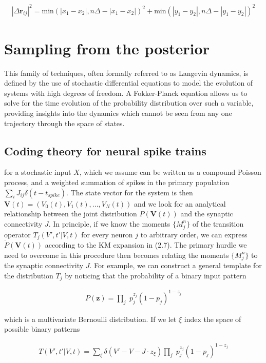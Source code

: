 \documentclass{ucetd}
\begin{document}
\begin{align*}
|\Delta\mathbf{r}_{ij}|^{2} = \mathrm{min}(|x_1 - x_2|, n\Delta - |x_1 - x_2|)^2 + \mathrm{min}(|y_1 - y_2|, n\Delta - |y_1 - y_2|)^2
\end{align*}


\chapter{Sampling from the posterior}

This family of techniques, often formally referred to as Langevin dynamics, is defined by the use of stochastic differential equations to model the evolution of systems with high degrees of freedom. A Fokker-Planck equation allows us to solve for the time evolution of the probability distribution over such a variable, providing insights into the dynamics which cannot be seen from any one trajectory through the space of states. 


\section{Coding theory for neural spike trains}


for a stochastic input $X$, which we assume can be written as a compound Poisson process, and a weighted summation of spikes in the primary population $\sum_{i}J_{ij}\delta(t-t_{spike})$. The state vector for the system is then $\mathbf{V}(t) = (V_{0}(t), V_{1}(t), ..., V_{N}(t))$ and we look for an analytical relationship between the joint distribution $P(\mathbf{V}(t))$ and the synaptic connectivity $J$. In principle, if we know the moments $\{M_{j}^{n}\}$  of the transition operator $T_{j}(V',t'|V,t)$ for every neuron $j$ to arbitrary order, we can express $\dot{P}(\mathbf{V}(t))$ according to the KM expansion in (2.7). The primary hurdle we need to overcome in this procedure then becomes relating the moments $\{M_{j}^{n}\}$ to the synaptic connectivity $J$. For example, we can construct a general template for the distribution $T_{j}$ by noticing that the probability of a binary input pattern

\begin{align*}
P(\mathbf{z}) = \underset{j}{\prod} \; p_{j}^{z_{j}}(1-p_{j})^{1-z_{j}}
\end{align*}

which is a multivariate Bernoulli distribution. If we let $\xi$ index the space of possible binary patterns

\begin{align}
T(V',t'|V,t) = \sum_{\xi} \delta(V'- V - J\cdot z_{\xi})\underset{j}{\prod} \; p_{j}^{z_{j}}(1-p_{j})^{1-z_{j}}
\end{align}
\end{document}
